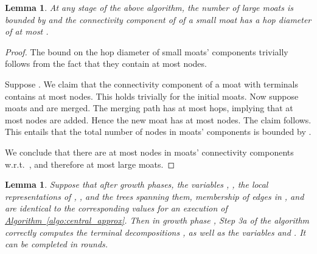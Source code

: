 \documentclass[letterpaper,11pt]{article}
\newtheorem{lemma}[theorem]{Lemma}
\newcommand{\namedref}[2]{\hyperref[#2]{#1~\ref*{#2}}}
\newcommand{\algref}[1]{\namedref{Algorithm}{#1}}
\begin{document}
\begin{lemma}\label{lemma:large_moats}
At any stage of the above algorithm, the number of large moats is bounded by
 and the connectivity component of  of a small moat has a hop
diameter of at most .
\end{lemma}
\begin{proof}
The bound on the hop diameter of small moats' components trivially follows from
the fact that they contain at most  nodes.

Suppose . We claim that the connectivity component of a moat with 
terminals contains at most  nodes. This holds trivially for the
initial moats. Now suppose moats  and  are merged. The merging path has
at most  hops, implying that at most  nodes are added. Hence the new
moat has at most  nodes. The claim follows. This entails that the total
number of nodes in moats' components is bounded by .

We conclude that there are at most  nodes in moats' connectivity
components w.r.t.\ , and therefore at most  large moats.
\end{proof}
\begin{lemma}\label{lemma:decomp_correct}
Suppose that after  growth phases, the
variables , ,
the local representations of , , and the trees
spanning them, membership of edges in , and
 are identical to the corresponding values for an
execution of \algref{algo:central_approx}. Then in growth phase , Step 3a
of the algorithm correctly computes the terminal decompositions , as well as the variables
 and . It can be completed in
 rounds.
\end{lemma}
\end{document}
